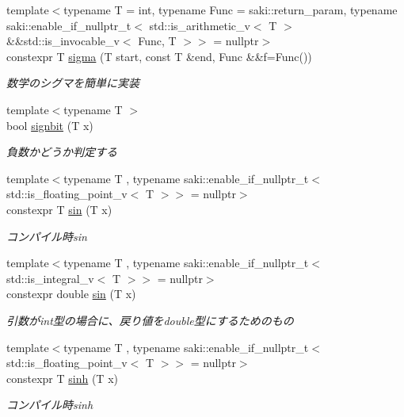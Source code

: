 \begin{DoxyCompactItemize}
{\footnotesize template$<$typename T  = int, typename Func  = saki\+::return\+\_\+param, typename saki\+::enable\+\_\+if\+\_\+nullptr\+\_\+t$<$ std\+::is\+\_\+arithmetic\+\_\+v$<$ T $>$ \&\&std\+::is\+\_\+invocable\+\_\+v$<$ Func, T $>$$>$  = nullptr$>$ }\\constexpr T \mbox{\hyperlink{namespacesaki_ac51e06f83630682641e0d99d5c957a9c}{sigma}} (T start, const T \&end, Func \&\&f=Func())
\begin{DoxyCompactList}\small\item\em 数学のシグマを簡単に実装 \end{DoxyCompactList}\item 
{\footnotesize template$<$typename T $>$ }\\bool \mbox{\hyperlink{namespacesaki_a5ed78463ed5808788e1b77eeecd9352a}{signbit}} (T x)
\begin{DoxyCompactList}\small\item\em 負数かどうか判定する \end{DoxyCompactList}\item 
{\footnotesize template$<$typename T , typename saki\+::enable\+\_\+if\+\_\+nullptr\+\_\+t$<$ std\+::is\+\_\+floating\+\_\+point\+\_\+v$<$ T $>$$>$  = nullptr$>$ }\\constexpr T \mbox{\hyperlink{namespacesaki_a743f7284cdebb6406db9b37e42bcd730}{sin}} (T x)
\begin{DoxyCompactList}\small\item\em コンパイル時sin \end{DoxyCompactList}\item 
{\footnotesize template$<$typename T , typename saki\+::enable\+\_\+if\+\_\+nullptr\+\_\+t$<$ std\+::is\+\_\+integral\+\_\+v$<$ T $>$$>$  = nullptr$>$ }\\constexpr double \mbox{\hyperlink{namespacesaki_a9fd77d1e52189e28f4a5d069891501cf}{sin}} (T x)
\begin{DoxyCompactList}\small\item\em 引数がint型の場合に、戻り値をdouble型にするためのもの \end{DoxyCompactList}\item 
{\footnotesize template$<$typename T , typename saki\+::enable\+\_\+if\+\_\+nullptr\+\_\+t$<$ std\+::is\+\_\+floating\+\_\+point\+\_\+v$<$ T $>$$>$  = nullptr$>$ }\\constexpr T \mbox{\hyperlink{namespacesaki_abe1ef6db83d59a5eb2daac9bff09d312}{sinh}} (T x)
\begin{DoxyCompactList}\small\item\em コンパイル時sinh \end{DoxyCompactList}\item 

\end{DoxyCompactItemize}
